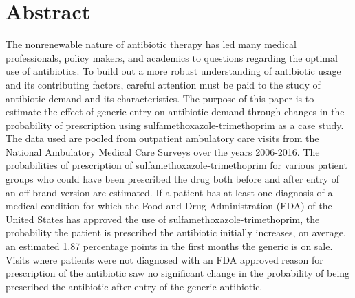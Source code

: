 \chapter*{Abstract} %
The nonrenewable nature of antibiotic therapy has led many medical professionals, policy makers, and academics to questions regarding the optimal use of antibiotics. To build out a more robust understanding of antibiotic usage and its contributing factors, careful attention must be paid to the study of antibiotic demand and its characteristics. The purpose of this paper is to estimate the effect of generic entry on antibiotic demand through changes in the probability of prescription using sulfamethoxazole-trimethoprim as a case study. The data used are pooled from outpatient ambulatory care visits from the National Ambulatory Medical Care Surveys over the years 2006-2016. The probabilities of prescription of sulfamethoxazole-trimethoprim for various patient groups who could have been prescribed the drug both before and after entry of an off brand version are estimated. If a patient has at least one diagnosis of a medical condition for which the Food and Drug Administration (FDA) of the United States has approved the use of sulfamethoxazole-trimethoprim, the probability the patient is prescribed the antibiotic initially increases, on average, an estimated 1.87 percentage points in the first months the generic is on sale. Visits where patients were not diagnosed with an FDA approved reason for prescription of the antibiotic saw no significant change in the probability of being prescribed the antibiotic after entry of the generic antibiotic.